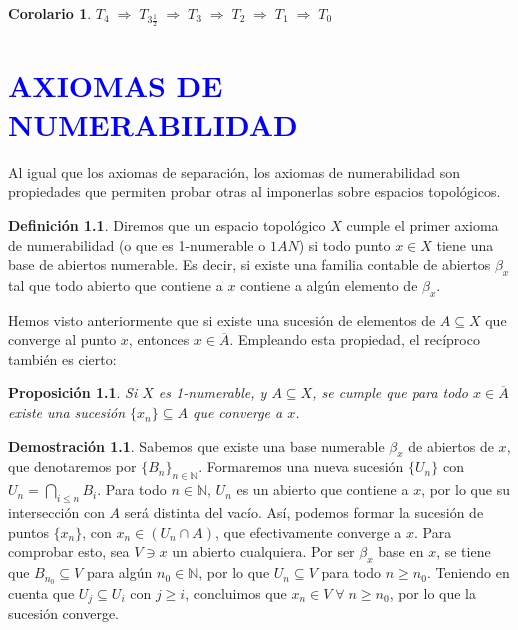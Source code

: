 \documentclass[12pt,twoside]{report}
\theoremstyle{azul}
\newtheorem*{corx}{Corolario}
\theoremstyle{azul2}
\theoremstyle{plain}
\newtheorem*{prop}{Proposición}
\theoremstyle{definition}
\newtheorem*{defi}{Definición}
\newtheorem*{dem}{Demostración}
\theoremstyle{remark}
\begin{document}
\begin{corx}
$T_4 \; \Rightarrow \; T_{3\frac{1}{2}} \; \Rightarrow \; T_3 \; \Rightarrow \; T_2 \; \Rightarrow \; T_1 \; \Rightarrow \; T_0$
\end{corx}

\chapter{\textcolor{blue}{AXIOMAS DE NUMERABILIDAD}}

Al igual que los axiomas de separación, los axiomas de numerabilidad son propiedades que permiten probar otras al imponerlas sobre espacios topológicos. 

\begin{defi}
Diremos que un espacio topológico $X$ cumple el primer axioma de numerabilidad (o que es 1-numerable o $1AN$) si todo punto $x \in X$ tiene una base de abiertos numerable. Es decir, si existe una familia contable de abiertos $\beta_x$ tal que todo abierto que contiene a $x$ contiene a algún elemento de $\beta_x$.
\end{defi}

Hemos visto anteriormente que si existe una sucesión de elementos de $A \subseteq X$ que converge al punto $x$, entonces $x \in \overline{A}$. Empleando esta propiedad, el recíproco también es cierto:

\begin{prop}
Si $X$ es 1-numerable, y $A \subseteq X$, se cumple que para todo $x \in \overline{A}$  existe una sucesión $\{x_n\} \subseteq A$ que converge a $x$.
\end{prop}
\begin{dem}
Sabemos que existe una base numerable $\beta_x$ de abiertos de $x$, que denotaremos por $\{B_n\}_{n \in \mathbb{N}}$. Formaremos una nueva sucesión $\{U_n\}$ con $U_n = \underset{i \leq n}{\bigcap} B_i$. Para todo $n \in \mathbb{N}$, $U_n$ es un abierto que contiene a $x$, por lo que su intersección con $A$ será distinta del vacío. Así, podemos formar la sucesión de puntos $\{x_n\}$, con $x_n \in (U_n \cap A)$, que efectivamente converge a $x$. Para comprobar esto, sea $V \ni x$ un abierto cualquiera. Por ser $\beta_x$ base en $x$, se tiene que $B_{n_0} \subseteq V$ para algún $n_0 \in \mathbb{N}$, por lo que $U_n \subseteq V$ para todo $n \geq n_0$. Teniendo en cuenta que $U_{j} \subseteq U_i$ con $j \geq i$, concluimos que $x_n \in V \;\forall\; n \geq n_0$, por lo que la sucesión converge.
\end{dem}
\end{document}
